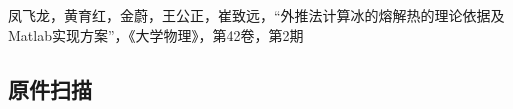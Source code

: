 \documentclass[dvipsnames, svgnames,a4paper,11pt]{article}
\begin{document}
\clearpage


\begin{thebibliography}{9}
	 凤飞龙，黄育红，金蔚，王公正，崔致远，“外推法计算冰的熔解热的理论依据及Matlab实现方案”，《大学物理》，第42卷，第2期
\end{thebibliography}


\clearpage
\appendix
\appendixpage
\addappheadtotoc
\subsection*{原件扫描}

\end{document}
